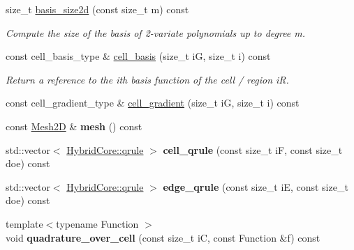 \begin{DoxyCompactItemize}
size\+\_\+t \hyperlink{classMeshFramework2D_1_1HybridCore_af6f2cd27f9ab6269de1b7c4768b21ed0}{basis\+\_\+size2d} (const size\+\_\+t m) const
\begin{DoxyCompactList}\small\item\em Compute the size of the basis of 2-\/variate polynomials up to degree m. \end{DoxyCompactList}\item 
const cell\+\_\+basis\+\_\+type \& \hyperlink{classMeshFramework2D_1_1HybridCore_a0205f1e764a58480cca800b5b301f89e}{cell\+\_\+basis} (size\+\_\+t iG, size\+\_\+t i) const
\begin{DoxyCompactList}\small\item\em Return a reference to the i\textquotesingle{}th basis function of the cell / region iR. \end{DoxyCompactList}\item 
const cell\+\_\+gradient\+\_\+type \& \hyperlink{classMeshFramework2D_1_1HybridCore_ae2292a9a5f8fe58d9a05c104419bcc2e}{cell\+\_\+gradient} (size\+\_\+t iG, size\+\_\+t i) const
\item 
\mbox{\label{classMeshFramework2D_1_1HybridCore_ac485aac154c0e9dbae4ac769415caff5}} 
const \hyperlink{classMeshFramework2D_1_1Mesh2D}{Mesh2D} \& {\bfseries mesh} () const
\item 
\mbox{\label{classMeshFramework2D_1_1HybridCore_aab2b1336ddafe9acd0d6fa31867e0498}} 
std\+::vector$<$ \hyperlink{structMeshFramework2D_1_1HybridCore_1_1qrule}{Hybrid\+Core\+::qrule} $>$ {\bfseries cell\+\_\+qrule} (const size\+\_\+t iF, const size\+\_\+t doe) const
\item 
\mbox{\label{classMeshFramework2D_1_1HybridCore_a763180d9c9d0bc2afaf5119ebd5fe236}} 
std\+::vector$<$ \hyperlink{structMeshFramework2D_1_1HybridCore_1_1qrule}{Hybrid\+Core\+::qrule} $>$ {\bfseries edge\+\_\+qrule} (const size\+\_\+t iE, const size\+\_\+t doe) const
\item 
\mbox{\label{classMeshFramework2D_1_1HybridCore_a70cf3142a23b473536a758bc85aa3a8e}} 
{\footnotesize template$<$typename Function $>$ }\\void {\bfseries quadrature\+\_\+over\+\_\+cell} (const size\+\_\+t iC, const Function \&f) const
\item 

\end{DoxyCompactItemize}
